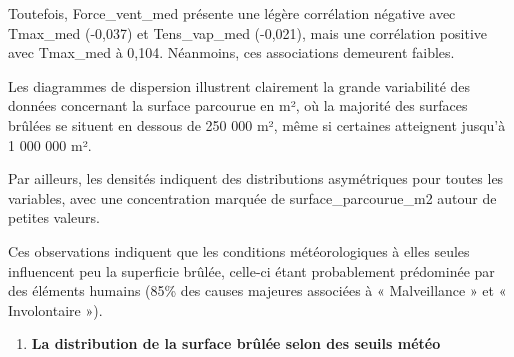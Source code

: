 \documentclass[
]{article}
\providecommand{\tightlist}{%
  \setlength{\itemsep}{0pt}\setlength{\parskip}{0pt}}
\begin{document}
Toutefois, Force\_vent\_med présente une légère corrélation négative
avec Tmax\_med (-0,037) et Tens\_vap\_med (-0,021), mais une corrélation
positive avec Tmax\_med à 0,104. Néanmoins, ces associations demeurent
faibles.

Les diagrammes de dispersion illustrent clairement la grande variabilité
des données concernant la surface parcourue en m², où la majorité des
surfaces brûlées se situent en dessous de 250 000 m², même si certaines
atteignent jusqu'à 1 000 000 m².

Par ailleurs, les densités indiquent des distributions asymétriques pour
toutes les variables, avec une concentration marquée de
surface\_parcourue\_m2 autour de petites valeurs.

Ces observations indiquent que les conditions météorologiques à elles
seules influencent peu la superficie brûlée, celle-ci étant probablement
prédominée par des éléments humains (85\% des causes majeures associées
à « Malveillance » et « Involontaire »).

\begin{enumerate}
\def\labelenumi{\arabic{enumi}.}
\setcounter{enumi}{3}
\tightlist
\item
  \textbf{La distribution de la surface brûlée selon des seuils météo}
\end{enumerate}
\end{document}
